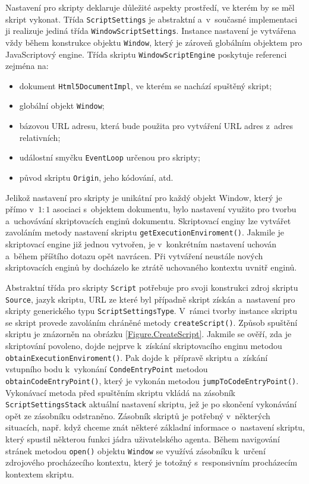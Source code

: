 Nastavení pro skripty deklaruje důležité aspekty prostředí, ve kterém by se měl skript vykonat. Třída \texttt{ScriptSettings} je abstraktní a~v~současné implementaci ji realizuje jediná třída \texttt{WindowScriptSettings}. Instance nastavení je vytvářena vždy během konstrukce objektu \texttt{Window}, který je zároveň globálním objektem pro JavaScriptový engine. Třída skriptu \texttt{WindowScriptEngine} poskytuje referenci zejména na:

\begin{itemize}
  \item dokument \texttt{Html5DocumentImpl}, ve kterém se nachází spuštěný skript;
  \item globální objekt \texttt{Window};
  \item bázovou URL adresu, která bude použita pro vytváření URL adres z~adres relativních;
  \item událostní smyčku \texttt{EventLoop} určenou pro skripty;
  \item původ skriptu \texttt{Origin}, jeho kódování, atd. 
\end{itemize}

Jelikož nastavení pro skripty je unikátní pro každý objekt Window, který je přímo v~$1:1$ asociaci s~objektem dokumentu, bylo nastavení využito pro tvorbu a~uchovávání skriptovacích enginů dokumentu. Skriptovací enginy lze vytvářet zavoláním metody nastavení skriptu \texttt{getExecutionEnviroment()}. Jakmile je skriptovací engine již jednou vytvořen, je v~konkrétním nastavení uchován a~během příštího dotazu opět navrácen. Při vytváření neustále nových skriptovacích enginů by docházelo ke ztrátě uchovaného kontextu uvnitř enginů.

Abstraktní třída pro skripty \texttt{Script} potřebuje pro svoji konstrukci zdroj skriptu \texttt{Source}, jazyk skriptu, URL ze které byl případně skript získán a~nastavení pro skripty generického typu \texttt{ScriptSettingsType}. V~rámci tvorby instance skriptu se skript provede zavoláním chráněné metody \texttt{createScript()}. Způsob spuštění skriptu je znázorněn na obrázku \ref{Figure.CreateScript}. Jakmile se ověří, zda je skriptování povoleno, dojde nejprve k~získání skriptovacího enginu metodou \texttt{obtainExecutionEnviroment()}. Pak dojde k~přípravě skriptu a~získání vstupního bodu k~vykonání \texttt{CondeEntryPoint} metodou \texttt{obtainCodeEntryPoint()}, který je vykonán metodou \texttt{jumpToCodeEntryPoint()}. Vykonávací metoda před spuštěním skriptu vkládá na zásobník \texttt{ScriptSettingsStack} aktuální nastavení skriptu, jež je po skončení vykonávání opět ze zásobníku odstraněno. Zásobník skriptů je potřebný v~některých situacích, např. když chceme znát některé základní informace o~nastavení skriptu, který spustil některou funkci jádra uživatelského agenta. Během navigování stránek metodou \texttt{open()} objektu \texttt{Window} se využívá zásobníku k~určení zdrojového procházecího kontextu, který je totožný s~responsivním procházecím kontextem skriptu.

